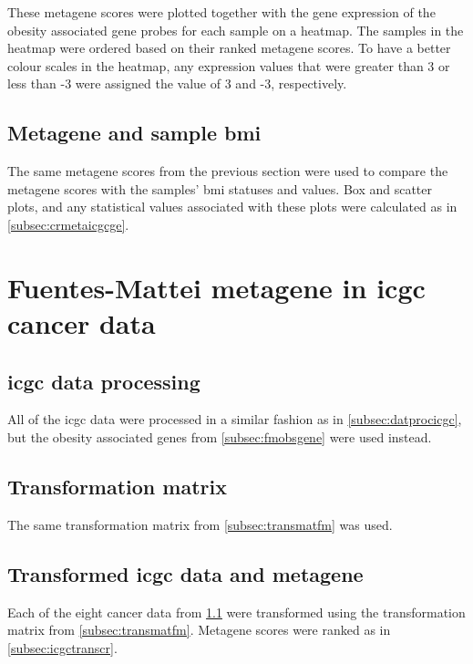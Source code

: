 These \gls{metagene} scores were plotted together with the gene expression of the obesity associated gene probes for each sample on a heatmap.
The samples in the heatmap were ordered based on their ranked \gls{metagene} scores.
To have a better colour scales in the heatmap, any expression values that were greater than 3 or less than -3 were assigned the value of 3 and -3, respectively.

\subsection{Metagene and sample \gls{bmi}}
\label{subsec:fmmetabmi}

The same \gls{metagene} scores from the previous section were used to compare the \gls{metagene} scores with the samples' \gls{bmi} statuses and values.
Box and scatter plots, and any statistical values associated with these plots were calculated as in \cref{subsec:crmetaicgcge}.

\section{Fuentes-Mattei metagene in \gls{icgc} cancer data}
\label{sec:fmmetaicgc}

\subsection{\gls{icgc} data processing}
\label{subsec:datprocicgcfm}

All of the \gls{icgc} data were processed in a similar fashion as in \cref{subsec:datprocicgc}, but the obesity associated genes from \cref{subsec:fmobsgene} were used instead.

\subsection{Transformation matrix}
\label{subsec:icgctransmatfm}

The same transformation matrix from \cref{subsec:transmatfm} was used.

\subsection{Transformed \gls{icgc} data and metagene}
\label{subsec:icgctransfm}

Each of the eight cancer data from \cref{subsec:datprocicgcfm} were transformed using the transformation matrix from \cref{subsec:transmatfm}.
Metagene scores were ranked as in \cref{subsec:icgctranscr}.

